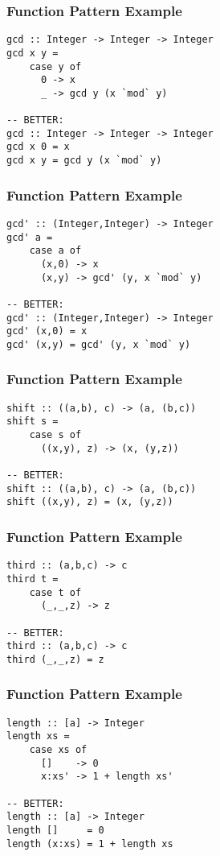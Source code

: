 \documentclass[dvipsnames]{beamer}
\theoremstyle{plain}
\begin{document}
\begin{frame}[fragile]
  \frametitle{Function Pattern Example}

  \begin{lstlisting}
gcd :: Integer -> Integer -> Integer
gcd x y =
    case y of
      0 -> x
      _ -> gcd y (x `mod` y)

-- BETTER:
gcd :: Integer -> Integer -> Integer
gcd x 0 = x
gcd x y = gcd y (x `mod` y)
  \end{lstlisting}
\end{frame}

\begin{frame}[fragile]
  \frametitle{Function Pattern Example}

  \begin{lstlisting}
gcd' :: (Integer,Integer) -> Integer
gcd' a =
    case a of
      (x,0) -> x
      (x,y) -> gcd' (y, x `mod` y)

-- BETTER:
gcd' :: (Integer,Integer) -> Integer
gcd' (x,0) = x
gcd' (x,y) = gcd' (y, x `mod` y)
  \end{lstlisting}
\end{frame}

\begin{frame}[fragile]
  \frametitle{Function Pattern Example}

  \begin{lstlisting}
shift :: ((a,b), c) -> (a, (b,c))
shift s =
    case s of
      ((x,y), z) -> (x, (y,z))

-- BETTER:
shift :: ((a,b), c) -> (a, (b,c))
shift ((x,y), z) = (x, (y,z))
  \end{lstlisting}
\end{frame}

\begin{frame}[fragile]
  \frametitle{Function Pattern Example}

  \begin{lstlisting}
third :: (a,b,c) -> c
third t =
    case t of
      (_,_,z) -> z

-- BETTER:
third :: (a,b,c) -> c
third (_,_,z) = z
  \end{lstlisting}
\end{frame}

\begin{frame}[fragile]
  \frametitle{Function Pattern Example}

  \begin{lstlisting}
length :: [a] -> Integer
length xs =
    case xs of
      []    -> 0
      x:xs' -> 1 + length xs'

-- BETTER:
length :: [a] -> Integer
length []     = 0
length (x:xs) = 1 + length xs
  \end{lstlisting}
\end{frame}
\end{document}
